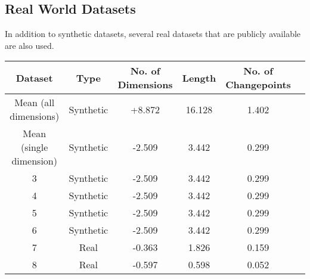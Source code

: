 \subsection{Real World Datasets}
In addition to synthetic datasets, several real datasets that are publicly available are also used. 

\begin{center}
\begin{tabular}{SSSSSS} \toprule
    {Dataset} & {Type} & {No. of Dimensions} & {Length} & {No. of Changepoints}  \\ \midrule
    {Mean (all dimensions)}  & {Synthetic} & +8.872 & 16.128 & 1.402  \\
    {Mean (single dimension)}  & {Synthetic}  & -2.509 & 3.442  & 0.299  \\
    3  & {Synthetic}  & -2.509 & 3.442  & 0.299  \\
    4 & {Synthetic}  & -2.509 & 3.442  & 0.299  \\
    5  & {Synthetic}  & -2.509 & 3.442  & 0.299  \\
    6  & {Synthetic}  & -2.509 & 3.442  & 0.299  \\
    7  & {Real}  & -0.363 & 1.826  & 0.159  \\
    8 & {Real}  & -0.597 & 0.598  & 0.052  \\ \bottomrule
\end{tabular}
\end{center}



